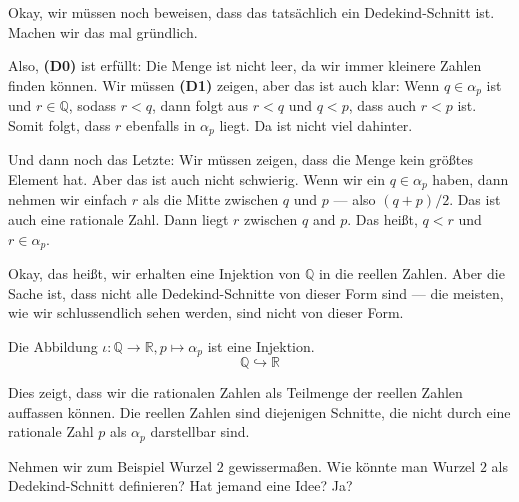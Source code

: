 \begin{spoken-clean}[00:33:24 - 00:35:23]
Okay, wir müssen noch beweisen, dass das tatsächlich ein Dedekind-Schnitt ist. Machen wir das mal gründlich. 

Also, \textbf{(D0)} ist erfüllt: Die Menge ist nicht leer, da wir immer kleinere Zahlen finden können. Wir müssen \textbf{(D1)} zeigen, aber das ist auch klar: Wenn $q \in \alpha_p$ ist und $r \in \mathbb{Q}$, sodass $r < q$, dann folgt aus $r < q$ und $q < p$, dass auch $r < p$ ist. Somit folgt, dass $r$ ebenfalls in $\alpha_p$ liegt. Da ist nicht viel dahinter.
\end{spoken-clean}

\begin{spoken-clean}[00:35:23 - 00:37:12]
Und dann noch das Letzte: Wir müssen zeigen, dass die Menge kein größtes Element hat. Aber das ist auch nicht schwierig. Wenn wir ein $q \in \alpha_p$ haben, dann nehmen wir einfach $r$ als die Mitte zwischen $q$ und $p$ --- also $(q + p) / 2$. Das ist auch eine rationale Zahl. Dann liegt $r$ zwischen $q$ and $p$. Das heißt, $q < r$ und $r \in \alpha_p$.

Okay, das heißt, wir erhalten eine Injektion von $\mathbb{Q}$ in die reellen Zahlen. Aber die Sache ist, dass nicht alle Dedekind-Schnitte von dieser Form sind --- die meisten, wie wir schlussendlich sehen werden, sind nicht von dieser Form.
\end{spoken-clean}

\begin{math-stroke}
Die Abbildung $\iota \colon \mathbb{Q} \to \mathbb{R}, p \mapsto \alpha_p$ ist eine Injektion.
\[ \mathbb{Q} \hookrightarrow \mathbb{R} \]
\begin{explanation-of-steps}
Dies zeigt, dass wir die rationalen Zahlen als Teilmenge der reellen Zahlen auffassen können. Die  reellen Zahlen sind diejenigen Schnitte, die nicht durch eine rationale Zahl $p$ als $\alpha_p$ darstellbar sind.
\end{explanation-of-steps}
\end{math-stroke}

\begin{spoken-clean}[00:37:12 - 00:38:15]
Nehmen wir zum Beispiel Wurzel $2$ gewissermaßen.  Wie könnte man Wurzel $2$ als Dedekind-Schnitt definieren? Hat jemand eine Idee? Ja?
\end{spoken-clean}


